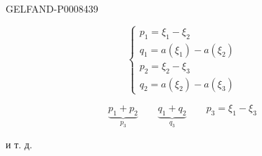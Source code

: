 \begin{GelfandAdjacentEvidence}{GELFAND-P000843}{9}


\begin{equation*}
\begin{cases}
p_1=\xi_1-\xi_2\\
q_1=a(\xi_1)-a(\xi_2)\\
p_2=\xi_2-\xi_3\\
q_2=a(\xi_2)-a(\xi_3)
\end{cases}
\tag{4}
\end{equation*}

\[
\underbrace{p_1+p_2}_{p_3}\qquad
\underbrace{q_1+q_2}_{q_3}\qquad
p_3=\xi_1-\xi_3
\]

и т. д.
\end{GelfandAdjacentEvidence}



